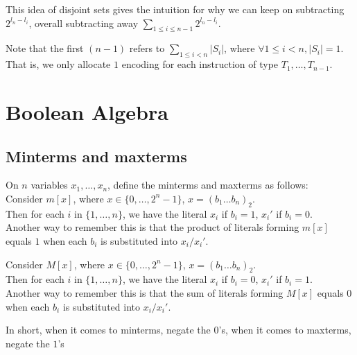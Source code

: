 \documentclass{article}
\begin{document}
This idea of disjoint sets gives the intuition for why we can keep on subtracting $2^{l_n-l_i}$, overall subtracting away $\sum_{1\leq i\leq n-1}2^{l_n-l_i}$.

Note that the first $(n-1)$ refers to $\sum_{1\leq i< n} |S_i|$, where $\forall 1\leq i<n,|S_i|=1$. That is, we only allocate $1$ encoding for each instruction of type $T_1,\dots,T_{n-1}$.

\section{Boolean Algebra}
\subsection{Minterms and maxterms}
On $n$ variables $x_1,\dots ,x_n$, define the minterms and maxterms as follows: \\
Consider $m[x]$, where $x\in \{0,\dots,2^n-1\}$, $x=(b_1\dots b_n)_2$.\\
Then for each $i$ in $\{1,\dots, n\}$, we have the literal $x_i$ if $b_i=1$, $x_i'$ if $b_i=0$.\\
Another way to remember this is that the product of literals forming $m[x]$ equals $1$ when each $b_i$ is substituted into $x_i/x_i'$. 

Consider $M[x]$, where $x\in \{0,\dots,2^n-1\}$, $x=(b_1\dots b_n)_2$.\\
Then for each $i$ in $\{1,\dots, n\}$, we have the literal $x_i$ if $b_i=0$, $x_i'$ if $b_i=1$.\\
Another way to remember this is that the sum of literals forming $M[x]$ equals $0$ when each $b_i$ is substituted into $x_i/x_i'$. 

In short, when it comes to minterms, negate the $0$'s, when it comes to maxterms, negate the $1$'s
\end{document}

